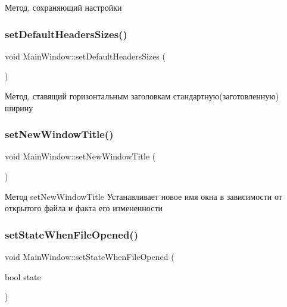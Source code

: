 Метод, сохраняющий настройки \mbox{\label{class_main_window_ac2946dc391053986a08990439dc21597}} 
\subsubsection{\texorpdfstring{setDefaultHeadersSizes()}{setDefaultHeadersSizes()}}
{\footnotesize\ttfamily void Main\+Window\+::set\+Default\+Headers\+Sizes (\begin{DoxyParamCaption}{ }\end{DoxyParamCaption})\hspace{0.3cm}{\ttfamily [private]}}

Метод, ставящий горизонтальным заголовкам стандартную(заготовленную) ширину \mbox{\label{class_main_window_aae88cde8d3fc8fe658a2ba01cb2495e1}} 
\subsubsection{\texorpdfstring{setNewWindowTitle()}{setNewWindowTitle()}}
{\footnotesize\ttfamily void Main\+Window\+::set\+New\+Window\+Title (\begin{DoxyParamCaption}{ }\end{DoxyParamCaption})}

Метод set\+New\+Window\+Title Устанавливает новое имя окна в зависимости от открытого файла и факта его измененности \mbox{\label{class_main_window_a342dfaa144e4dbae8d3663d068e65e73}} 
\subsubsection{\texorpdfstring{setStateWhenFileOpened()}{setStateWhenFileOpened()}}
{\footnotesize\ttfamily void Main\+Window\+::set\+State\+When\+File\+Opened (\begin{DoxyParamCaption}\item[{bool}]{state }\end{DoxyParamCaption})\hspace{0.3cm}{\ttfamily [private]}}


